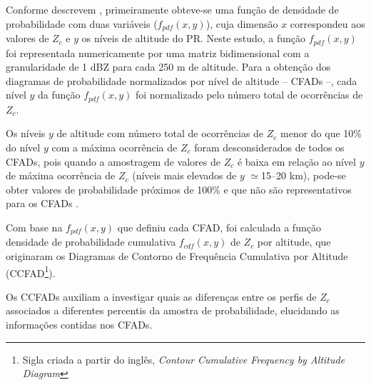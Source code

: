 Conforme descrevem , primeiramente obteve-se uma função de densidade de probabilidade com duas variáveis ($f_{pdf}(x,y)$), cuja  dimensão $x$ correspondeu aos valores de $Z_{c}$ e $y$ os níveis de altitude do PR. Neste estudo, a função $f_{pdf}(x,y)$ foi representada numericamente por uma matriz bidimensional com a granularidade de 1 dBZ para cada 250 m de altitude. Para a obtenção dos diagramas de probabilidade normalizados por nível de altitude -- CFADs --, cada nível $y$ da função $f_{pdf}(x,y)$ foi normalizado pelo número total de ocorrências de $Z_c$. 

Os níveis $y$ de altitude com número total de ocorrências de $Z_c$ menor do que 10\% do nível $y$ com a máxima ocorrência de $Z_c$ foram desconsiderados de todos os CFADs, pois quando a amostragem de valores de $Z_c$ é baixa em relação ao nível $y$ de máxima ocorrência de $Z_c$ (níveis mais elevados de $y$ $\simeq$15--20 km),  pode-se obter valores de probabilidade próximos de 100\% e que não são representativos para os CFADs \cite[Apêndice~A]{yuter1995}.


Com base na $f_{pdf}(x,y)$ que definiu cada CFAD, foi calculada a função densidade de probabilidade cumulativa $f_{cdf}(x,y)$ de $Z_c$ por altitude, que originaram os Diagramas de Contorno de Frequência Cumulativa por Altitude (CCFAD\footnote{Sigla criada a partir do inglês, \textit{Contour Cumulative Frequency by Altitude Diagram}}).     



Os CCFADs auxiliam a investigar quais as diferenças entre os perfis de $Z_c$ associados a diferentes percentis da amostra de probabilidade, elucidando as informações contidas nos CFADs.	


